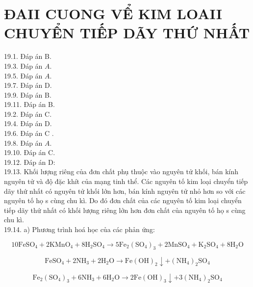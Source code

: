 \documentclass[10pt]{article}
\begin{document}
\section*{ĐAII CUONG VỂ KIM LOAII CHUYỂN TIẾP DÃY THỨ NHẤT}
19.1. Đáp án B.\\
19.3. Đáp án $A$.\\
19.5. Đáp án $A$.\\
19.7. Đáp án D.\\
19.9. Đáp án B.\\
19.11. Đáp án B.\\
19.2. Đáp án C.\\
19.4. Đáp án D.\\
19.6. Đáp án C .\\
19.8. Đáp án $A$.\\
19.10. Đáp án C.\\
19.12. Đáp án D:\\
19.13. Khối lượng riêng của đơn chất phụ thuộc vào nguyên tử khối, bán kính nguyên tử và độ đặc khít của mạng tinh thể. Các nguyên tố kim loại chuyển tiếp dãy thứ nhất có nguyên tử khối lớn hơn, bán kính nguyên tử nhỏ hơn so với các nguyên tố họ s cùng chu kì. Do đó đơn chất của các nguyên tố kim loại chuyển tiếp dãy thứ nhất có khối lượng riêng lởn hơn đơn chất của nguyên tố họ s cùng chu kì.\\
19.14. a) Phương trình hoá học của các phản ứng:


\begin{equation*}
10 \mathrm{FeSO}_{4}+2 \mathrm{KMnO}_{4}+8 \mathrm{H}_{2} \mathrm{SO}_{4} \rightarrow 5 \mathrm{Fe}_{2}\left(\mathrm{SO}_{4}\right)_{3}+2 \mathrm{MnSO}_{4}+\mathrm{K}_{2} \mathrm{SO}_{4}+8 \mathrm{H}_{2} \mathrm{O} \tag{1}
\end{equation*}



\begin{equation*}
\mathrm{FeSO}_{4}+2 \mathrm{NH}_{3}+2 \mathrm{H}_{2} \mathrm{O} \rightarrow \mathrm{Fe}(\mathrm{OH})_{2} \downarrow+\left(\mathrm{NH}_{4}\right)_{2} \mathrm{SO}_{4} \tag{2}
\end{equation*}



\begin{equation*}
\mathrm{Fe}_{2}\left(\mathrm{SO}_{4}\right)_{3}+6 \mathrm{NH}_{3}+6 \mathrm{H}_{2} \mathrm{O} \rightarrow 2 \mathrm{Fe}(\mathrm{OH})_{3} \downarrow+3\left(\mathrm{NH}_{4}\right)_{2} \mathrm{SO}_{4} \tag{3}
\end{equation*}
\end{document}
